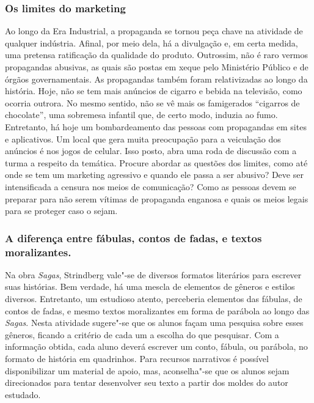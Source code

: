 \documentclass[12pt]{extarticle}
\begin{document}
\subsubsection{Os limites do marketing}


Ao longo da Era Industrial, a propaganda se tornou peça chave na
atividade de qualquer indústria. Afinal, por meio dela, há a
divulgação e, em certa medida, uma pretensa ratificação da qualidade
do produto. Outrossim, não é raro vermos propagandas abusivas, as
quais são postas em xeque pelo Ministério Público e de órgãos
governamentais. As propagandas também foram relativizadas ao longo da
história. Hoje, não se tem mais anúncios de cigarro e bebida na
televisão, como ocorria outrora. No mesmo sentido, não se vê mais os
famigerados ``cigarros de chocolate'', uma sobremesa infantil que, de
certo modo, induzia ao fumo. Entretanto, há hoje um bombardeamento das
pessoas com propagandas em sites e aplicativos. Um local que gera
muita preocupação para a veiculação dos anúncios é nos jogos de
celular. Isso posto, abra uma roda de discussão com a turma a respeito
da temática. Procure abordar as questões dos limites, como até onde se
tem um marketing agressivo e quando ele passa a ser abusivo? Deve ser
intensificada a censura nos meios de comunicação? Como as pessoas
devem se preparar para não serem vítimas de propaganda enganosa e
quais os meios legais para se proteger caso o sejam.

\subsubsection{A diferença entre fábulas, contos de fadas, e
textos moralizantes.}


Na obra \emph{Sagas}, Strindberg vale"-se de diversos formatos
literários para escrever suas histórias. Bem verdade, há uma mescla de
elementos de gêneros e estilos diversos. Entretanto, um estudioso
atento, perceberia elementos das fábulas, de contos de fadas, e mesmo
textos moralizantes em forma de parábola ao longo das \emph{Sagas}.
Nesta atividade sugere"-se que os alunos façam uma pesquisa sobre esses
gêneros, ficando a critério de cada um a escolha do que pesquisar. Com
a informação obtida, cada aluno deverá escrever um conto, fábula, ou
parábola, no formato de história em quadrinhos. Para recursos
narrativos é possível disponibilizar um material de apoio, mas,
aconselha"-se que os alunos sejam direcionados para tentar desenvolver
seu texto a partir dos moldes do autor estudado.
\end{document}
